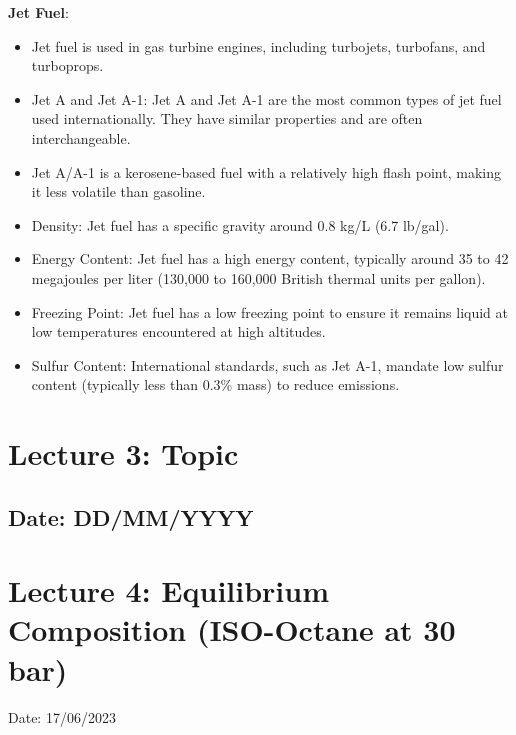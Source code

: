 \documentclass{article}
\begin{document}
\textbf{Jet Fuel}:
\begin{itemize}
  \item Jet fuel is used in gas turbine engines, including turbojets, turbofans, and turboprops.
  \item Jet A and Jet A-1: Jet A and Jet A-1 are the most common types of jet fuel used internationally. They have similar properties and are often interchangeable.
  \item Jet A/A-1 is a kerosene-based fuel with a relatively high flash point, making it less volatile than gasoline.
  \item Density: Jet fuel has a specific gravity around 0.8 kg/L (6.7 lb/gal).
  \item Energy Content: Jet fuel has a high energy content, typically around 35 to 42 megajoules per liter (130,000 to 160,000 British thermal units per gallon).
  \item Freezing Point: Jet fuel has a low freezing point to ensure it remains liquid at low temperatures encountered at high altitudes.
  \item Sulfur Content: International standards, such as Jet A-1, mandate low sulfur content (typically less than 0.3\% mass) to reduce emissions.
\end{itemize}



\newpage

\section{Lecture 3: Topic}
\subsection*{Date: DD/MM/YYYY}


\newpage

\section{Lecture 4: Equilibrium Composition (ISO-Octane at 30 bar)}
\hfill Date: 17/06/2023
\end{document}

